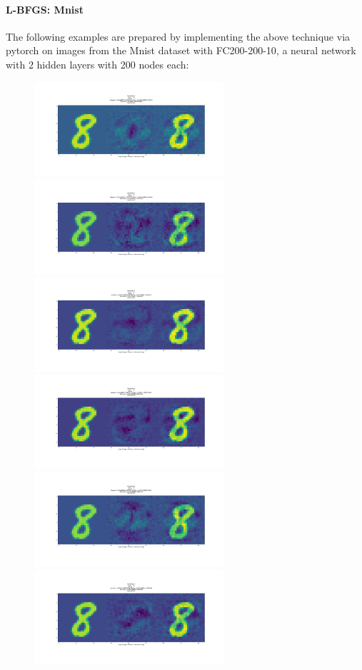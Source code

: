 \paragraph{L-BFGS: Mnist}
The following examples are prepared by implementing the above technique via pytorch on images from the Mnist dataset with FC200-200-10, a neural network with 2 hidden layers with 200 nodes each:
\begin{figure}[H]
\label{lbfgsa}
\includegraphics[trim=200 185 100 200, clip, width=7cm]{c1_figures/FC200-200-10-2448-O8-A0-attack_summary.png}\includegraphics[trim=200 185 100 200, clip,width=7cm]{c1_figures/FC200-200-10-2448-O8-A1-attack_summary.png}
\includegraphics[trim=200 185 100 200, clip,width=7cm]{c1_figures/FC200-200-10-2448-O8-A2-attack_summary.png}\includegraphics[trim=200 185 100 200, clip,width=7cm]{c1_figures/FC200-200-10-2448-O8-A3-attack_summary.png}
\includegraphics[trim=200 185 100 200, clip,width=7cm]{c1_figures/FC200-200-10-2448-O8-A4-attack_summary.png}\includegraphics[trim=200 185 100 200, clip,width=7cm]{c1_figures/FC200-200-10-2448-O8-A5-attack_summary.png}

\end{figure}
